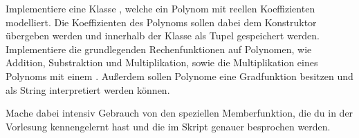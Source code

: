 \begin{aufg}
  Implementiere eine Klasse , welche ein Polynom mit reellen 
  Koeffizienten modelliert.
  Die Koeffizienten des Polynoms sollen dabei dem Konstruktor übergeben werden
  und innerhalb der Klasse als Tupel gespeichert werden.
  Implementiere die grundlegenden Rechenfunktionen auf Polynomen, wie 
  Addition, Substraktion und Multiplikation, sowie die Multiplikation eines 
  Polynoms mit einem .
  Außerdem sollen Polynome eine Gradfunktion besitzen und als String interpretiert werden können.

  Mache dabei intensiv Gebrauch von den speziellen Memberfunktion, die du
  in der Vorlesung kennengelernt hast und die im Skript genauer besprochen werden.
\end{aufg}
